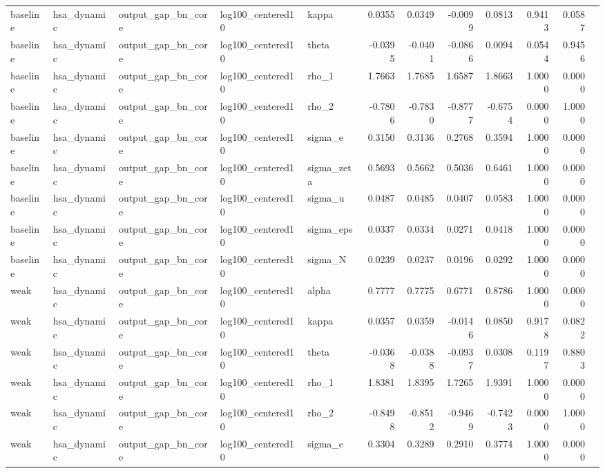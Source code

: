 \begin{tabular}{lllllrrrrrrl}
baseline & hsa\_dynamic & output\_gap\_bn\_core & log100\_centered10 & kappa & 0.0355 & 0.0349 & -0.0099 & 0.0813 & 0.9413 & 0.0587 &  \\
baseline & hsa\_dynamic & output\_gap\_bn\_core & log100\_centered10 & theta & -0.0395 & -0.0401 & -0.0866 & 0.0094 & 0.0544 & 0.9456 &  \\
baseline & hsa\_dynamic & output\_gap\_bn\_core & log100\_centered10 & rho\_1 & 1.7663 & 1.7685 & 1.6587 & 1.8663 & 1.0000 & 0.0000 &  \\
baseline & hsa\_dynamic & output\_gap\_bn\_core & log100\_centered10 & rho\_2 & -0.7806 & -0.7830 & -0.8777 & -0.6754 & 0.0000 & 1.0000 &  \\
baseline & hsa\_dynamic & output\_gap\_bn\_core & log100\_centered10 & sigma\_e & 0.3150 & 0.3136 & 0.2768 & 0.3594 & 1.0000 & 0.0000 &  \\
baseline & hsa\_dynamic & output\_gap\_bn\_core & log100\_centered10 & sigma\_zeta & 0.5693 & 0.5662 & 0.5036 & 0.6461 & 1.0000 & 0.0000 &  \\
baseline & hsa\_dynamic & output\_gap\_bn\_core & log100\_centered10 & sigma\_u & 0.0487 & 0.0485 & 0.0407 & 0.0583 & 1.0000 & 0.0000 &  \\
baseline & hsa\_dynamic & output\_gap\_bn\_core & log100\_centered10 & sigma\_eps & 0.0337 & 0.0334 & 0.0271 & 0.0418 & 1.0000 & 0.0000 &  \\
baseline & hsa\_dynamic & output\_gap\_bn\_core & log100\_centered10 & sigma\_N & 0.0239 & 0.0237 & 0.0196 & 0.0292 & 1.0000 & 0.0000 &  \\
weak & hsa\_dynamic & output\_gap\_bn\_core & log100\_centered10 & alpha & 0.7777 & 0.7775 & 0.6771 & 0.8786 & 1.0000 & 0.0000 &  \\
weak & hsa\_dynamic & output\_gap\_bn\_core & log100\_centered10 & kappa & 0.0357 & 0.0359 & -0.0146 & 0.0850 & 0.9178 & 0.0822 &  \\
weak & hsa\_dynamic & output\_gap\_bn\_core & log100\_centered10 & theta & -0.0368 & -0.0388 & -0.0937 & 0.0308 & 0.1197 & 0.8803 &  \\
weak & hsa\_dynamic & output\_gap\_bn\_core & log100\_centered10 & rho\_1 & 1.8381 & 1.8395 & 1.7265 & 1.9391 & 1.0000 & 0.0000 &  \\
weak & hsa\_dynamic & output\_gap\_bn\_core & log100\_centered10 & rho\_2 & -0.8498 & -0.8512 & -0.9469 & -0.7423 & 0.0000 & 1.0000 &  \\
weak & hsa\_dynamic & output\_gap\_bn\_core & log100\_centered10 & sigma\_e & 0.3304 & 0.3289 & 0.2910 & 0.3774 & 1.0000 & 0.0000 &  \\

\end{tabular}
